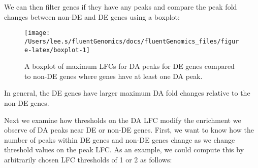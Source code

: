 \documentclass[
]{article}
\newenvironment{Shaded}{}{}
\newcommand{\DataTypeTok}[1]{\textcolor[rgb]{0.56,0.13,0.00}{#1}}
\newcommand{\DecValTok}[1]{\textcolor[rgb]{0.25,0.63,0.44}{#1}}
\newcommand{\KeywordTok}[1]{\textcolor[rgb]{0.00,0.44,0.13}{\textbf{#1}}}
\newcommand{\NormalTok}[1]{#1}
\newcommand{\OperatorTok}[1]{\textcolor[rgb]{0.40,0.40,0.40}{#1}}
\newcommand{\OtherTok}[1]{\textcolor[rgb]{0.00,0.44,0.13}{#1}}
\newcommand{\StringTok}[1]{\textcolor[rgb]{0.25,0.44,0.63}{#1}}
\begin{document}
We can then filter genes if they have any peaks and compare the peak fold
changes between non-DE and DE genes using a boxplot:

\begin{Shaded}
\end{Shaded}

\begin{figure}

{\centering \texttt{[image: /Users/lee.s/fluentGenomics/docs/fluentGenomics\_files/figure-latex/boxplot-1]} 

}

\caption{A boxplot of maximum LFCs for DA peaks for DE genes compared to non-DE genes where genes have at least one DA peak.}\label{fig:boxplot}
\end{figure}

In general, the DE genes have larger maximum DA fold changes relative to the
non-DE genes.

Next we examine how thresholds on the DA LFC modify the enrichment we observe
of DA peaks near DE or non-DE genes. First, we want to know how the number of
peaks within DE genes and non-DE genes change as we change threshold values on
the peak LFC. As an example, we could compute this by arbitrarily chosen LFC
thresholds of 1 or 2 as follows:

\begin{Shaded}
\end{Shaded}
\end{document}

